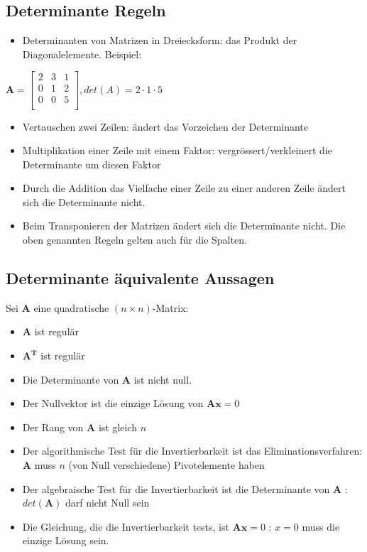 \documentclass[../main.tex]{subfiles}
\begin{document}
\subsection{Determinante Regeln}
\begin{itemize}
    \item Determinanten von Matrizen in Dreiecksform: das Produkt der Diagonalelemente. Beispiel:
\end{itemize}
$\mathbf{A} =
\begin{bmatrix}
    2 & 3 & 1 \\
    0 & 1 & 2 \\
    0 & 0 & 5 \\
\end{bmatrix}, det(A)=2\cdot1\cdot5$ \\
\begin{itemize}
    \item Vertauschen zwei Zeilen: ändert das Vorzeichen der Determinante
    \item Multiplikation einer Zeile mit einem Faktor: vergrössert/verkleinert die Determinante um diesen Faktor
    \item Durch die Addition das Vielfache einer Zeile zu einer anderen Zeile ändert sich die Determinante nicht.
    \item Beim Transponieren der Matrizen ändert sich die Determinante nicht. Die oben genannten Regeln gelten auch für die Spalten.
\end{itemize}

\subsection{Determinante äquivalente Aussagen}
Sei $\mathbf{A}$ eine quadratische $(n\times n)$-Matrix:
\begin{itemize}
    \item $\mathbf{A}$ ist regulär
    \item $\mathbf{A^T}$ ist regulär
    \item Die Determinante von $\mathbf{A}$ ist nicht null.
    \item Der Nullvektor ist die einzige Lösung von $\mathbf{Ax}=0$
    \item Der Rang von $\mathbf{A}$ ist gleich $n$
    \item Der algorithmische Test für die Invertierbarkeit ist das Eliminationsverfahren: $\mathbf{A}$ muss $n$
    (von Null verschiedene) Pivotelemente haben
    \item Der algebraische Test für die Invertierbarkeit ist die Determinante von $\mathbf{A}$ : $det(\mathbf{A})$ darf
    nicht Null sein
    \item Die Gleichung, die die Invertierbarkeit tests, ist $\mathbf{Ax}=0$ : $x = 0$ muss die einzige Lösung
    sein.
\end{itemize}
\end{document}
